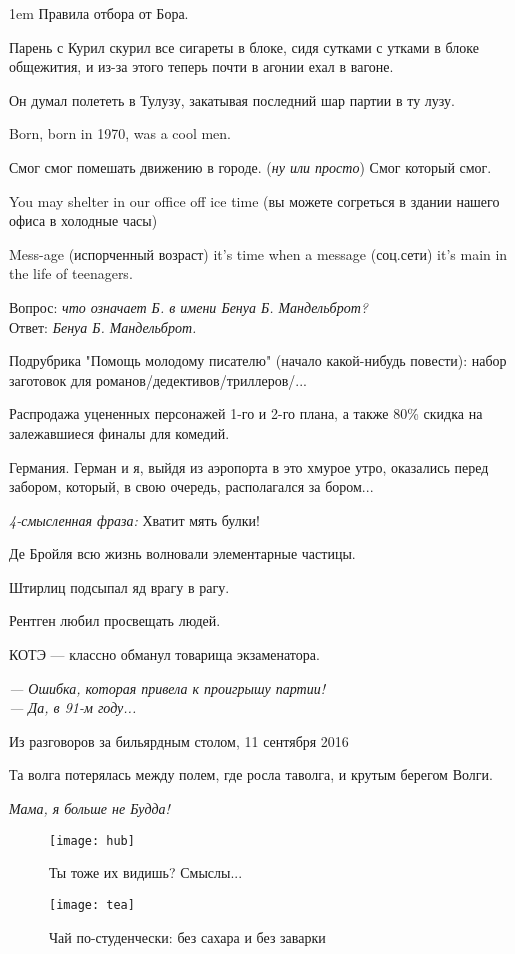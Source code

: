 \begin{flushleft}\parskip1em
    Правила отбора от Бора.

    Парень с Курил скурил все сигареты в блоке, сидя сутками с утками в блоке общежития, и из-за этого теперь почти в агонии ехал в вагоне.

    Он думал полететь в Тулузу, закатывая последний шар партии в ту лузу.

    Born, born in 1970, was a cool men.

    Смог смог помешать движению в городе. (\emph{ну или просто}) Смог который смог.

    You may shelter in our office off ice time (вы можете согреться в здании нашего офиса в холодные часы)

    Mess-age (испорченный возраст) it's time when a message (соц.сети) it's main in the life of teenagers.

    Вопрос: \emph{что означает Б. в имени Бенуа Б. Мандельброт?}\\
    Ответ: \emph{Бенуа Б. Мандельброт.}

    Подрубрика "Помощь молодому писателю" (начало какой-нибудь повести): набор заготовок для романов/дедективов/триллеров/...

    Распродажа уцененных персонажей 1-го и 2-го плана, а также 80\% скидка на залежавшиеся финалы для комедий.

    Германия. Герман и я, выйдя из аэропорта в это хмурое утро, оказались перед забором, который, в свою очередь, располагался за бором...

    \emph{4-смысленная фраза:} Хватит мять булки!

    Де Бройля всю жизнь волновали элементарные частицы.

    Штирлиц подсыпал яд врагу в рагу.

    Рентген любил просвещать людей.

    КОТЭ --- классно обманул товарища экзаменатора.

    \emph{--- Ошибка, которая привела к проигрышу партии!\\
    --- Да, в 91-м году...}
    \vspace*{-1em}\begin{flushright}
        Из разговоров за бильярдным столом, 11 сентября 2016
    \end{flushright}

    Та волга потерялась между полем, где росла таволга, и крутым берегом Волги. %

    \emph{Мама, я больше не Будда!}
\end{flushleft}
\begin{figure}[ht!]
    \centering
    \texttt{[image: hub]}
    \caption{Ты тоже их видишь? Смыслы...}
\end{figure}
\begin{figure}[ht!]
    \centering
    \texttt{[image: tea]}
    \caption{Чай по-студенчески: без сахара и без заварки}
\end{figure}

